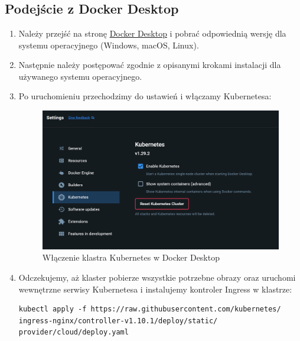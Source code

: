 \documentclass[polish]{aghengthesis}
\begin{document}
\chapter{\ChapterTitleInstallMethod} \label{sec:instalacja}

\section{Podejście z Docker Desktop}


\begin{enumerate}
\item Należy przejść na stronę \href{https://www.docker.com/products/docker-desktop}{Docker Desktop} i pobrać odpowiednią wersję dla systemu operacyjnego (Windows, macOS, Linux).
\item Następnie należy postępować zgodnie z opisanymi krokami instalacji dla używanego systemu operacyjnego.
\item Po uruchomieniu przechodzimy do ustawień i włączamy Kubernetesa:
\begin{figure}[H]
    \centering
    \includegraphics[width=0.75\linewidth]{resources/dockerDesktop.PNG}
    \caption{Włączenie klastra Kubernetes w Docker Desktop}
    \label{fig:enter-label}
\end{figure}
\item Odczekujemy, aż klaster pobierze wszystkie potrzebne obrazy oraz uruchomi wewnętrzne serwisy Kubernetesa i instalujemy kontroler Ingress w klastrze:
\begin{lstlisting}[basicstyle=\ttfamily, numbers=none]
kubectl apply -f https://raw.githubusercontent.com/kubernetes/
ingress-nginx/controller-v1.10.1/deploy/static/
provider/cloud/deploy.yaml\end{lstlisting}\vspace{-20pt}

\end{enumerate}
\end{document}
